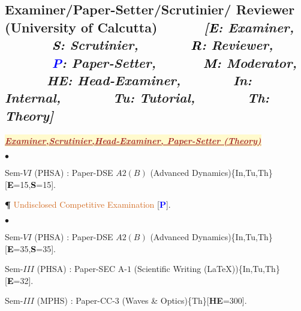 \documentclass[margin,line]{res}
\newenvironment{list1}{
  \begin{list}{\ding{113}}{%
      \setlength{\itemsep}{0in}
      \setlength{\parsep}{0in} \setlength{\parskip}{0in}
      \setlength{\topsep}{0in} \setlength{\partopsep}{0in} 
      \setlength{\leftmargin}{0.17in}}}{\end{list}}
\newenvironment{list2}{
  \begin{list}{$\bullet$}{%
      \setlength{\itemsep}{0in}
      \setlength{\parsep}{0in} \setlength{\parskip}{0in}
      \setlength{\topsep}{0in} \setlength{\partopsep}{0in} 
      \setlength{\leftmargin}{0.2in}}}{\end{list}}
\begin{document}
\begin{resume}
\section{\sc Examiner/Paper-Setter/Scrutinier/ Reviewer (University of Calcutta) $\;\;\;\;\;\;\;\;\;\;\;\;${\it [\textcolor{black}{\bf E}: Examiner, $\;\;\;\;\;\;\;\;\;\;\;\;$ \textcolor{black}{\bf S}: Scrutinier, $\;\;\;\;\;\;\;\;\;\;\;\;$ \textcolor{black}{\bf R}: Reviewer, $\;\;\;\;\;\;\;\;\;\;\;\;$ \textcolor{blue}{\bf P}: Paper-Setter, $\;\;\;\;\;\;\;\;\;\;\;\;$\textcolor{black}{\bf M}: Moderator, $\;\;\;\;\;\;\;\;\;\;\;\;$\textcolor{asparagus}{\bf HE}: Head-Examiner, $\;\;\;\;\;\;\;\;\;\;\;\;$ \textcolor{alizarin}{\bf In}: Internal, $\;\;\;\;\;\;\;\;\;\;\;\;$ \textcolor{alizarin}{\bf Tu}: Tutorial, $\;\;\;\;\;\;\;\;\;\;\;\;$ \textcolor{alizarin}{\bf Th}: Theory]}}
\begin{list1}
\item[] \colorbox{lemonchiffon}{\textcolor{brown}{\underline{\textbf{\textit{Examiner,Scrutinier,Head-Examiner, Paper-Setter (Theory)}}}}}
\vspace{1mm}
\end{list1}
\begin{list1}
\item[] \textcolor{iris}{}
\vspace{1mm}
\end{list1}
\begin{list2}
\item Sem-$VI$ (PHSA) : Paper-DSE $A2(B)$ (Advanced Dynamics)\textcolor{alizarin}{\{In,Tu,Th\}}[\textcolor{black}{\bf E}=15,\textcolor{black}{\bf S}=15].
\item[{\bf \P}] \textcolor{chocolate}{Undisclosed Competitive Examination} [\textcolor{blue}{\bf P}]. 
\end{list2}
\begin{list1}
\item[] \textcolor{iris}{}
\vspace{1mm}
\end{list1}
\begin{list2}
\item Sem-$VI$ (PHSA) : Paper-DSE $A2(B)$ (Advanced Dynamics)\textcolor{alizarin}{\{In,Tu,Th\}}[\textcolor{black}{\bf E}=35,\textcolor{black}{\bf S}=35].
\item Sem-$III$ (PHSA) : Paper-SEC A-$1$ (Scientific Writing (\LaTeX))\textcolor{alizarin}{\{In,Tu,Th\}}[\textcolor{black}{\bf E}=32]. 
\item Sem-$III$ (MPHS) : Paper-CC-$3$ (Waves \& Optics)\textcolor{alizarin}{\{Th\}}[\textcolor{asparagus}{\bf HE}=300]. 

\end{list2}
\end{resume}
\end{document}
